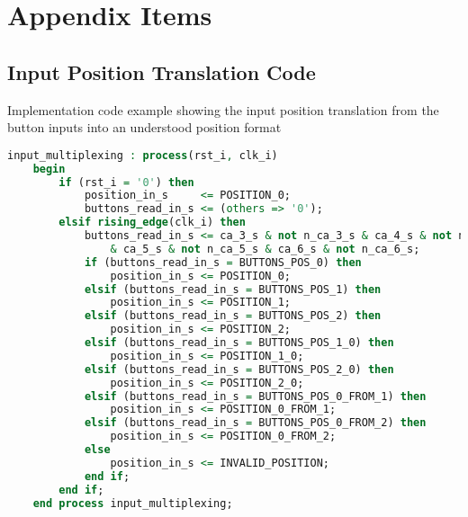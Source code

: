 \chapter{Appendix Items}




\lstset{style=mystyle}



\section{Input Position Translation Code} %
\label{position-multiplexing-code}
Implementation code example showing the input position translation from the button inputs into an understood position format
\begin{lstlisting}[language=VHDL]
	input_multiplexing : process(rst_i, clk_i) 
	begin
		if (rst_i = '0') then
			position_in_s     <= POSITION_0;
			buttons_read_in_s <= (others => '0'); 
		elsif rising_edge(clk_i) then
			buttons_read_in_s <= ca_3_s & not n_ca_3_s & ca_4_s & not n_ca_4_s 
			    & ca_5_s & not n_ca_5_s & ca_6_s & not n_ca_6_s;
			if (buttons_read_in_s = BUTTONS_POS_0) then
				position_in_s <= POSITION_0;
			elsif (buttons_read_in_s = BUTTONS_POS_1) then
				position_in_s <= POSITION_1;
			elsif (buttons_read_in_s = BUTTONS_POS_2) then
				position_in_s <= POSITION_2;
			elsif (buttons_read_in_s = BUTTONS_POS_1_0) then
				position_in_s <= POSITION_1_0;
			elsif (buttons_read_in_s = BUTTONS_POS_2_0) then
				position_in_s <= POSITION_2_0;
			elsif (buttons_read_in_s = BUTTONS_POS_0_FROM_1) then
				position_in_s <= POSITION_0_FROM_1;
			elsif (buttons_read_in_s = BUTTONS_POS_0_FROM_2) then
				position_in_s <= POSITION_0_FROM_2;
			else
				position_in_s <= INVALID_POSITION;
			end if;
		end if;
	end process input_multiplexing;
\end{lstlisting}



